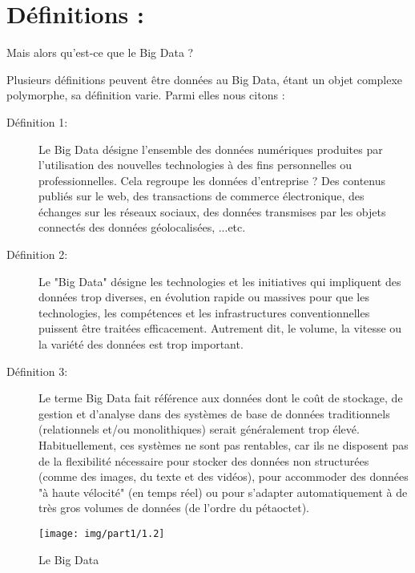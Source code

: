 \section{Définitions : }
\begin{center}
	\color[rgb]{0.2, 0.6, 0.2} Mais alors qu'est-ce que le Big Data ?
\end{center}

Plusieurs définitions peuvent être données au Big Data, étant un objet complexe polymorphe, sa définition varie. Parmi elles nous citons :

\begin{description}
	\item[Définition 1:]Le Big Data désigne l'ensemble des données numériques produites par l'utilisation des nouvelles technologies à des fins personnelles ou professionnelles. Cela regroupe les données d'entreprise ? Des contenus publiés sur le web, des transactions de commerce électronique, des échanges sur les réseaux sociaux, des données transmises par les objets connectés des données géolocalisées, ...etc.
	\item[Définition 2:]Le "Big Data" désigne les technologies et les initiatives qui impliquent des données trop diverses, en évolution rapide ou massives pour que les technologies, les compétences et les infrastructures conventionnelles puissent être traitées efficacement. Autrement dit, le volume, la vitesse ou la variété des données est trop important.
	\item[Définition 3:]Le terme Big Data fait référence aux données dont le coût de stockage, de gestion et d'analyse dans des systèmes de base de données traditionnels (relationnels et/ou monolithiques) serait généralement trop élevé. Habituellement, ces systèmes ne sont pas rentables, car ils ne disposent pas de la flexibilité nécessaire pour stocker des données non structurées (comme des images, du texte et des vidéos), pour accommoder des données "à haute vélocité" (en temps réel) ou pour s'adapter automatiquement à de très gros volumes de données (de l'ordre du pétaoctet).
\end{description}

\begin{figure}[h]
	\centering
	\texttt{[image: img/part1/1.2]}
	\caption{Le Big Data}
\end{figure}